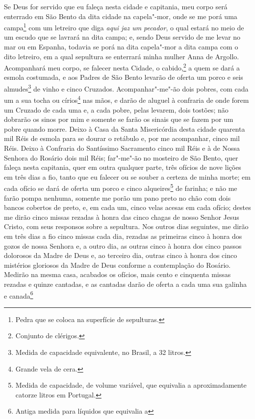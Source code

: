 \begin{linenumbers}
Se Deus for servido que eu faleça nesta cidade e capitania, meu corpo
será enterrado em São Bento da dita cidade na capela"-mor, onde se me
porá uma campa\footnote{ Pedra que se coloca na superfície de
sepulturas.} com um letreiro que diga \textit{aqui jaz um pecador}, o
qual estará no meio de um escudo que se lavrará na dita campa; e, sendo
Deus servido de me levar no mar ou em Espanha, todavia se porá na dita
capela"-mor a dita campa com o dito letreiro, em a qual sepultura se
enterrará minha mulher Anna de Argollo. Acompanhará meu corpo, se
falecer nesta Cidade, o cabido,\footnote{ Conjunto de clérigos.} a quem
se dará a esmola costumada, e aos Padres de São Bento levarão de oferta
um porco e seis almudes\footnote{ Medida de capacidade equivalente, no
Brasil, a 32 litros.} de vinho e cinco Cruzados. Acompanhar"-me"-ão dois
pobres, com cada um a sua tocha ou círios\footnote{ Grande vela de
cera.} nas mãos, e darão de aluguel à confraria de onde forem um
Cruzado de cada uma e, a cada pobre, pelas levarem, dois tostões; não
dobrarão os sinos por mim e somente se farão os sinais que se fazem por
um pobre quando morre. Deixo à Casa da Santa Misericórdia desta cidade
quarenta mil Réis de esmola para se dourar o retábulo e, por me
acompanhar, cinco mil Réis. Deixo à Confraria do Santíssimo Sacramento
cinco mil Réis e à de Nossa Senhora do Rosário dois mil Réis; far"-me"-ão
no mosteiro de São Bento, quer faleça nesta capitania, quer em outra
qualquer parte, três ofícios de nove lições em três dias a fio, tanto
que eu falecer ou se souber a certeza de minha morte; em cada ofício se
dará de oferta um porco e cinco alqueires\footnote{ Medida de
capacidade, de volume variável, que equivalia a aproximadamente catorze
litros em Portugal.} de farinha; e não me farão pompa nenhuma, somente
me porão um pano preto no chão com dois bancos cobertos de preto, e, em
cada um, cinco velas acesas em cada ofício; destes me dirão cinco
missas rezadas à honra das cinco chagas de nosso Senhor Jesus Cristo,
com seus responsos sobre a sepultura. Nos outros dias seguintes, me
dirão em três dias a fio cinco missas cada dia, rezadas as primeiras
cinco à honra dos gozos de nossa Senhora e, a outro dia, as outras
cinco à honra dos cinco passos dolorosos da Madre de Deus e, ao
terceiro dia, outras cinco à honra dos cinco mistérios gloriosos da
Madre de Deus conforme a contemplação do Rosário. Medirão na mesma
casa, acabados os ofícios, mais cento e cinquenta missas rezadas e
quinze cantadas, e as cantadas darão de oferta a cada uma sua galinha e
canada\footnote{ Antiga medida para líquidos que equivalia a
}
\end{linenumbers}
